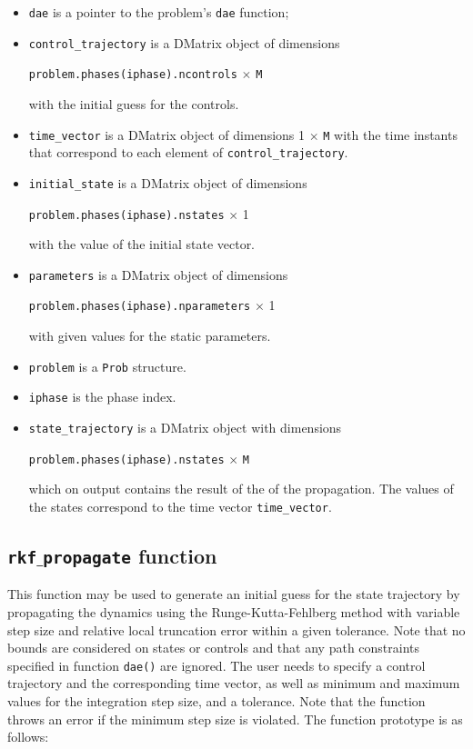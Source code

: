 \documentclass[a4paper,11pt]{report}    %
\begin{document}
\begin{itemize}
 \item \verb|dae| is a pointer to the problem's \verb|dae| function;
 \item \verb|control_trajectory| is a DMatrix object of dimensions 

\verb|problem.phases(iphase).ncontrols| $\times$ \verb|M| 

\noindent with the initial guess for the controls.
 \item \verb|time_vector| is a DMatrix object of dimensions 1 $\times$ \verb|M| with the time instants that
correspond to each element of \verb|control_trajectory|.
 \item  \verb|initial_state| is a DMatrix object of dimensions 

\verb|problem.phases(iphase).nstates| $\times$ 1  

\noindent with the  value of the initial state vector.
\item \verb|parameters| is a DMatrix object of dimensions 

\verb|problem.phases(iphase).nparameters| $\times$ 1 

\noindent with given values for the static parameters.
\item \verb|problem| is a \verb|Prob| structure.
\item \verb|iphase| is the phase index.
\item \verb|state_trajectory| is a DMatrix object with dimensions 

\verb|problem.phases(iphase).nstates| $\times$ \verb|M| 

\noindent which on output contains the result of the of the propagation. 
The values of the states correspond to the time vector \verb|time_vector|.
\end{itemize}



\subsection{ \texttt{rkf$\_$propagate} function }

This function may be used to generate an initial guess for the state trajectory by propagating the dynamics
using the Runge-Kutta-Fehlberg method with variable step size and relative local truncation error within a given tolerance. 
Note that no bounds are considered on states or controls and that any path constraints specified in function \verb|dae()| are
ignored. The user needs to specify a control trajectory and the corresponding time vector, as well as minimum
and maximum values for the integration step size, and a tolerance. Note that the function
throws an error if the minimum step size is violated. The function prototype is as follows:
\end{document}
